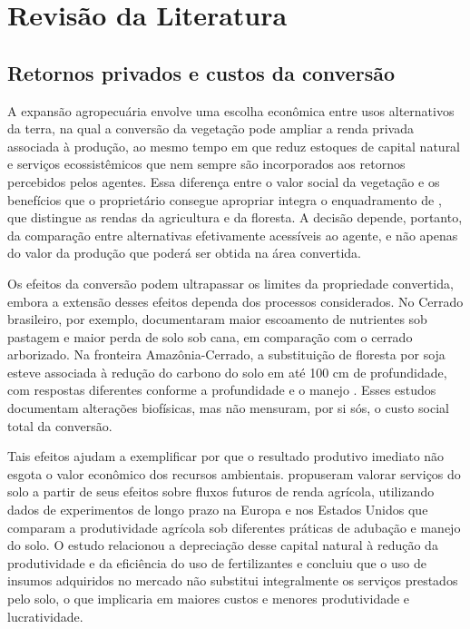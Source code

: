 \section{Revisão da Literatura}
\label{sec:literatura}

\subsection{Retornos privados e custos da conversão}

A expansão agropecuária envolve uma escolha econômica entre usos alternativos da terra, na qual a conversão da vegetação pode ampliar a renda privada associada à produção, ao mesmo tempo em que reduz estoques de capital natural e serviços ecossistêmicos que nem sempre são incorporados aos retornos percebidos pelos agentes. Essa diferença entre o valor social da vegetação e os benefícios que o proprietário consegue apropriar integra o enquadramento de , que distingue as rendas da agricultura e da floresta. A decisão depende, portanto, da comparação entre alternativas efetivamente acessíveis ao agente, e não apenas do valor da produção que poderá ser obtida na área convertida.

Os efeitos da conversão podem ultrapassar os limites da propriedade convertida, embora a extensão desses efeitos dependa dos processos considerados. No Cerrado brasileiro, por exemplo,  documentaram maior escoamento de nutrientes sob pastagem e maior perda de solo sob cana, em comparação com o cerrado arborizado. Na fronteira Amazônia-Cerrado, a substituição de floresta por soja esteve associada à redução do carbono do solo em até 100 cm de profundidade, com respostas diferentes conforme a profundidade e o manejo \cite{Popin2025}. Esses estudos documentam alterações biofísicas, mas não mensuram, por si sós, o custo social total da conversão.

Tais efeitos ajudam a exemplificar por que o resultado produtivo imediato não esgota o valor econômico dos recursos ambientais.  propuseram valorar serviços do solo a partir de seus efeitos sobre fluxos futuros de renda agrícola, utilizando dados de experimentos de longo prazo na Europa e nos Estados Unidos que comparam a produtividade agrícola sob diferentes práticas de adubação e manejo do solo. O estudo relacionou a depreciação desse capital natural à redução da produtividade e da eficiência do uso de fertilizantes e concluiu que o uso de insumos adquiridos no mercado não substitui integralmente os serviços prestados pelo solo, o que implicaria em maiores custos e menores produtividade e lucratividade.

